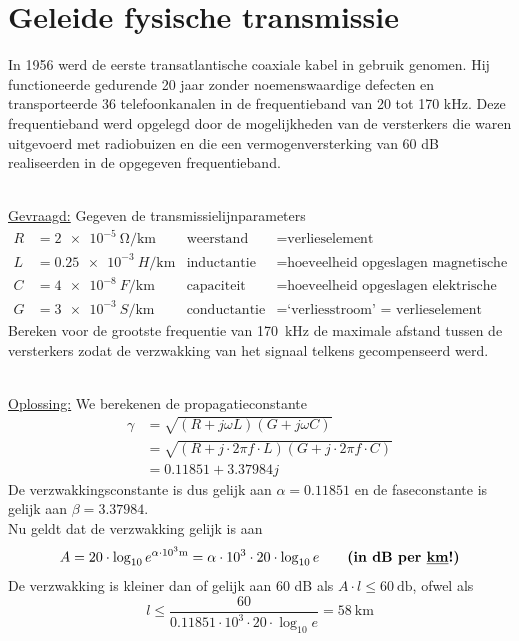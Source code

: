 \documentclass[kulak]{kulakarticle}
\begin{document}
	\newpage

	\section{Geleide fysische transmissie}

	In 1956 werd de eerste transatlantische coaxiale kabel in gebruik genomen. Hij functioneerde gedurende 20 jaar zonder noemenswaardige defecten en transporteerde 36 telefoonkanalen in de frequentieband van 20 tot 170 kHz. Deze frequentieband werd opgelegd door de mogelijkheden van de versterkers die waren uitgevoerd met radiobuizen en die een vermogenversterking van 60 dB realiseerden in de opgegeven frequentieband.

	\hfill \\
	\underline{Gevraagd:}
	Gegeven de transmissielijnparameters \begin{align*}
			R &= \SI{2e-5}{\ohm/\kilo\meter} &\text{weerstand}\ &= \text{verlieselement} \\
			L &= \SI{0.25e-3}{H/\kilo\meter} &\text{inductantie} &= \text{hoeveelheid opgeslagen magnetische energie} \\
			C &= \SI{4e-8}{F/\kilo\meter} &\text{capaciteit} &= \text{hoeveelheid opgeslagen elektrische energie} \\
			G &= \SI{3e-3}{S/\kilo\meter} &\text{conductantie} &= \text{`verliesstroom' = verlieselement}
		\end{align*} Bereken voor de grootste frequentie van \SI{170}{\kilo\hertz} de maximale afstand tussen de versterkers zodat de verzwakking van het signaal telkens gecompenseerd werd.

	\hfill \\
	\underline{Oplossing:}
	We berekenen de propagatieconstante \begin{align*}
		\gamma &= \sqrt{(R+j\omega L)(G+j\omega C)} \\
				&= \sqrt{(R+j \cdot 2\pi f \cdot L)(G+j \cdot 2\pi f \cdot C)} \\
				&= 0.11851 + 3.37984j
	\end{align*}
	De verzwakkingsconstante is dus gelijk aan \(\alpha = 0.11851\) en de faseconstante is gelijk aan \(\beta = 3.37984\). \\Nu geldt dat de verzwakking gelijk is aan \[
	A = 20 \cdot \log_{10} e^{\alpha \cdot 10^3 \unit{\meter}}=\alpha \cdot 10^3 \cdot 20 \cdot \log_{10} e \qquad \text{\textbf{(in dB per \underline{km}!)}}\] De verzwakking is kleiner dan of gelijk aan 60 dB als \(A \cdot l \leq \SI{60}{\decibel}\), ofwel als \[l\leq\frac{60}{0.11851\cdot 10^3\cdot 20 \cdot \log_{10} e} = \boxed{\SI{58}{\kilo\meter}}\]
\end{document}
